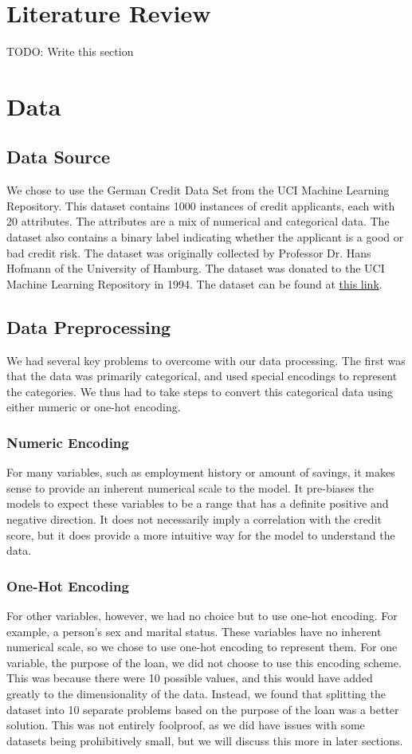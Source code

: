 \documentclass[12pt,twocolumn]{article}
\begin{document}
\section{Literature Review}
TODO: Write this section
\newpage

\section{Data}
\subsection{Data Source}
We chose to use the German Credit Data Set from the UCI Machine Learning Repository. This dataset contains 1000 instances of credit applicants, each with 20 attributes. The attributes are a mix of numerical and categorical data. The dataset also contains a binary label indicating whether the applicant is a good or bad credit risk. The dataset was originally collected by Professor Dr. Hans Hofmann of the University of Hamburg. The dataset was donated to the UCI Machine Learning Repository in 1994. The dataset can be found at \href{https://archive.ics.uci.edu/ml/datasets/statlog+(german+credit+data)}{this link}.

\subsection{Data Preprocessing}
We had several key problems to overcome with our data processing. The first was that the data was primarily categorical, and used special encodings to represent the categories. We thus had to take steps to convert this categorical data using either numeric or one-hot encoding. 

\subsubsection{Numeric Encoding}
For many variables, such as employment history or amount of savings, it makes sense to provide an inherent numerical scale to the model. It pre-biases the models to expect these variables to be a range that has a definite positive and negative direction. It does not necessarily imply a correlation with the credit score, but it does provide a more intuitive way for the model to understand the data.

\subsubsection{One-Hot Encoding}
For other variables, however, we had no choice but to use one-hot encoding. For example, a person's sex and marital status. These variables have no inherent numerical scale, so we chose to use one-hot encoding to represent them. For one variable, the purpose of the loan, we did not choose to use this encoding scheme. This was because there were 10 possible values, and this would have added greatly to the dimensionality of the data. Instead, we found that splitting the dataset into 10 separate problems based on the purpose of the loan was a better solution. This was not entirely foolproof, as we did have issues with some datasets being prohibitively small, but we will discuss this more in later sections.
\end{document}
